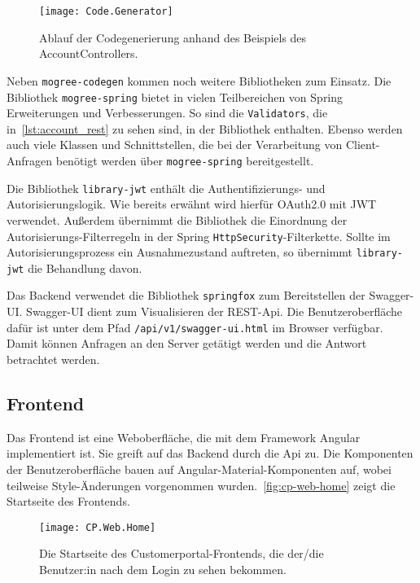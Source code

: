 \begin{figure}[h]
    \caption{Ablauf der Codegenerierung anhand des Beispiels des AccountControllers.}
    \centering
    \texttt{[image: Code.Generator]}
    \label{fig:codegen-diagram}
\end{figure}

Neben \texttt{mogree-codegen} kommen noch weitere Bibliotheken zum Einsatz. Die Bibliothek \texttt{mogree-spring} bietet in vielen Teilbereichen von Spring Erweiterungen und Verbesserungen. So sind die \texttt{Validators}, die in~\autoref{lst:account_rest} zu sehen sind, in der Bibliothek enthalten. Ebenso werden auch viele Klassen und Schnittstellen, die bei der Verarbeitung von Client-Anfragen benötigt werden über \texttt{mogree-spring} bereitgestellt.

Die Bibliothek \texttt{library-jwt} enthält die Authentifizierungs- und Autorisierungslogik. Wie bereits erwähnt wird hierfür OAuth2.0 mit JWT verwendet. Außerdem übernimmt die Bibliothek die Einordnung der Autorisierungs-Filterregeln in der Spring \texttt{HttpSecurity}-Filterkette. Sollte im Autorisierungsprozess ein Ausnahmezustand auftreten, so übernimmt \texttt{library-jwt} die Behandlung davon.

Das Backend verwendet die Bibliothek \texttt{springfox} zum Bereitstellen der Swagger-UI. Swagger-UI dient zum Visualisieren der REST-Api. Die Benutzeroberfläche dafür ist unter dem Pfad \texttt{/api/v1/swagger-ui.html} im Browser verfügbar. Damit können Anfragen an den Server getätigt werden und die Antwort betrachtet werden.

\subsection{Frontend}
\label{sec:design-frontend}

Das Frontend ist eine Weboberfläche, die mit dem Framework Angular implementiert ist. Sie greift auf das Backend durch die Api zu. Die Komponenten der Benutzeroberfläche bauen auf Angular-Material-Komponenten auf, wobei teilweise Style-Änderungen vorgenommen wurden.~\autoref{fig:cp-web-home} zeigt die Startseite des Frontends.

\begin{figure}[h]
    \caption{Die Startseite des Customerportal-Frontends, die der/die Benutzer:in nach dem Login zu sehen bekommen.}
    \centering
    \texttt{[image: CP.Web.Home]}
    \label{fig:cp-web-home}
\end{figure}

